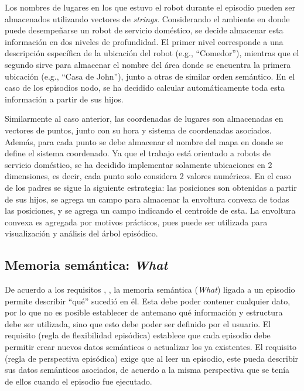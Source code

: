 Los nombres de lugares en los que estuvo el robot durante el episodio pueden ser almacenados utilizando vectores de \textit{strings}. Considerando el ambiente en donde puede desempeñarse un robot de servicio doméstico, se decide almacenar esta información en dos niveles de profundidad. El primer nivel corresponde a una descripción específica de la ubicación del robot (e.g., ``Comedor''), mientras que el segundo sirve para almacenar el nombre del área donde se encuentra la primera ubicación (e.g., ``Casa de John''), junto a otras de similar orden semántico. En el caso de los episodios nodo, se ha decidido calcular automáticamente toda esta información a partir de sus hijos.

Similarmente al caso anterior, las coordenadas de lugares son almacenadas en vectores de puntos, junto con su hora y sistema de coordenadas asociados. Además, para cada punto se debe almacenar el nombre del mapa en donde se define el sistema coordenado. Ya que el trabajo está orientado a robots de servicio doméstico, se ha decidido implementar solamente ubicaciones en 2 dimensiones, es decir, cada punto solo considera 2 valores numéricos. En el caso de los padres se sigue la siguiente estrategia: las posiciones son obtenidas a partir de sus hijos, se agrega un campo para almacenar la envoltura convexa de todas las posiciones, y se agrega un campo indicando el centroide de esta. La envoltura convexa es agregada por motivos prácticos, pues puede ser utilizada para visualización y análisis del árbol episódico.



\subsection{Memoria semántica: \textit{What}}\label{sec:design_ep_what}

De acuerdo a los requisitos , , la memoria semántica (\textit{What}) ligada a un episodio permite describir ``qué'' sucedió en él. Esta debe poder  contener cualquier dato, por lo que no es posible establecer de antemano qué información y estructura debe ser utilizada, sino que esto debe poder ser definido por el usuario. El requisito  (regla de flexibilidad episódica) establece que cada episodio debe permitir crear nuevos datos semánticos o actualizar los ya existentes. El requisito  (regla de perspectiva episódica) exige que al leer un episodio, este pueda describir sus datos semánticos asociados, de acuerdo a la misma perspectiva que se tenía de ellos cuando el episodio fue ejecutado.

